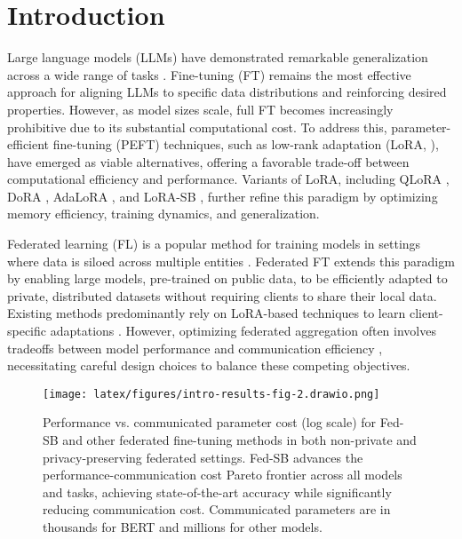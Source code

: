 \section{Introduction}
\label{intro}
\quad Large language models (LLMs) have demonstrated remarkable generalization across a wide range of tasks \citep{achiam2023gpt, touvron2023llama-2, team2023gemini, raffel2020exploring}.
Fine-tuning (FT) remains the most effective approach for aligning LLMs to specific data distributions and reinforcing desired properties. 
However, as model sizes scale, full FT becomes increasingly prohibitive due to its substantial computational cost. 
To address this, parameter-efficient fine-tuning (PEFT) techniques, such as low-rank adaptation (LoRA, \citet{lora}), have emerged as viable alternatives, offering a favorable trade-off between computational efficiency and performance. 
Variants of LoRA, including QLoRA \citep{qlora}, DoRA \citep{liu2024doraweightdecomposedlowrankadaptation}, AdaLoRA \citep{adalora}, and LoRA-SB \citep{ponkshe2024initialization}, further refine this paradigm by optimizing memory efficiency, training dynamics, and generalization.

Federated learning (FL) is a popular method for training models in settings where data is siloed across multiple entities \citep{konečný2017federatedlearningstrategiesimproving, kairouz2021advances, bonawitz2019federatedlearningscaledesign}.
Federated FT extends this paradigm by enabling large models, pre-trained on public data, to be efficiently adapted to private, distributed datasets without requiring clients to share their local data. 
Existing methods predominantly rely on LoRA-based techniques to learn client-specific adaptations \citep{FedIT}. 
However, optimizing federated aggregation often involves tradeoffs between model performance \citep{sun2024improving} and communication efficiency \citep{wang2024flora, singhal2024exact}, necessitating careful design choices to balance these competing objectives.

\begin{figure*}[!h]
    \centering
    \texttt{[image: latex/figures/intro-results-fig-2.drawio.png]}
    \caption{Performance vs. communicated parameter cost (log scale) for Fed-SB and other federated fine-tuning methods in both non-private and privacy-preserving federated settings. Fed-SB advances the performance-communication cost Pareto frontier across all models and tasks, achieving state-of-the-art accuracy while significantly reducing communication cost. Communicated parameters are in thousands for BERT and millions for other models.}
    \label{fig:intro-results}
\end{figure*}

